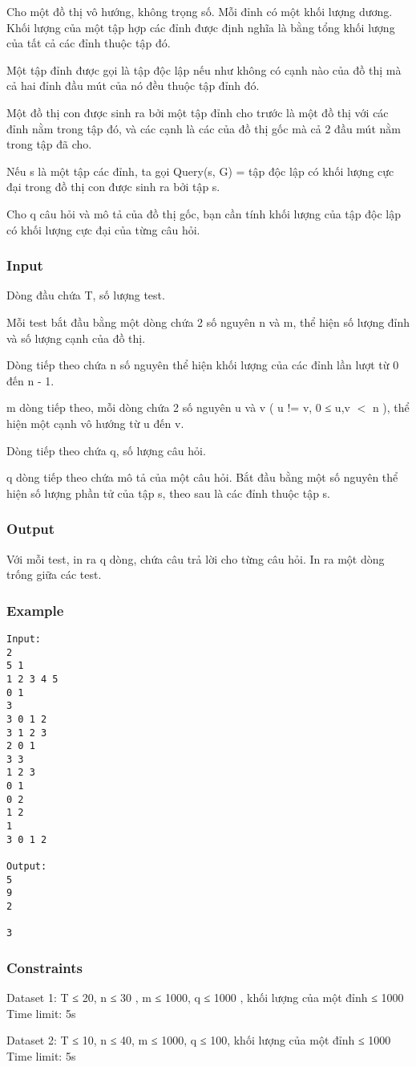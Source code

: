 



   Cho một đồ thị vô hướng, không trọng số. Mỗi đỉnh có một khối lượng dương. Khối lượng của một tập hợp các đỉnh được định nghĩa là bằng tổng khối lượng của tất cả các đỉnh thuộc tập đó.  

   Một tập đỉnh được gọi là tập độc lập nếu như không có cạnh nào của đồ thị mà cả hai đỉnh đầu mút của nó đều thuộc tập đỉnh đó.  

   Một đồ thị con được sinh ra bởi một tập đỉnh cho trước là một đồ thị với các đỉnh nằm trong tập đó, và các cạnh là các của đồ thị gốc mà cả 2 đầu mút nằm trong tập đã cho.  

   Nếu s là một tập các đỉnh, ta gọi Query(s, G) = tập độc lập có khối lượng cực đại trong đồ thị con được sinh ra bởi tập s.  

   Cho q câu hỏi và mô tả của đồ thị gốc, bạn cần tính khối lượng của tập độc lập có khối lượng cực đại của từng câu hỏi.  

\subsubsection{   Input  }

   Dòng đầu chứa T, số lượng test.  

   Mỗi test bắt đầu bằng một dòng chứa 2 số nguyên n và  m, thể hiện số lượng đỉnh và số lượng cạnh của đồ thị.  

   Dòng tiếp theo chứa n số nguyên thể hiện khối lượng của các đỉnh lần lượt từ 0 đến n - 1.  

   m dòng tiếp theo, mỗi dòng chứa 2 số nguyên u và v ( u != v, 0 ≤ u,v $<$ n ), thể hiện một cạnh vô hướng từ u đến v.  

   Dòng tiếp theo chứa q, số lượng câu hỏi.  

   q dòng tiếp theo chứa mô tả của một câu hỏi. Bắt đầu bằng một số nguyên thể hiện số lượng phần tử của tập s, theo sau là các đỉnh thuộc tập s.  

\subsubsection{   Output  }

   Với mỗi test, in ra q dòng, chứa câu trả lời cho từng câu hỏi. In ra một dòng trống giữa các test.  

\subsubsection{   Example  }
\begin{verbatim}
Input:
2
5 1
1 2 3 4 5
0 1
3
3 0 1 2
3 1 2 3
2 0 1
3 3
1 2 3
0 1
0 2
1 2
1
3 0 1 2

Output:
5
9
2

3 
\end{verbatim}

\subsubsection{   Constraints  }

   Dataset 1: T ≤ 20, n ≤ 30 , m ≤ 1000, q ≤ 1000 , khối lượng của một đỉnh ≤ 1000 Time limit: 5s  

   Dataset 2: T ≤ 10, n ≤ 40, m ≤ 1000, q ≤ 100, khối lượng của một đỉnh ≤ 1000 Time limit: 5s  